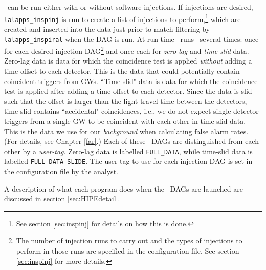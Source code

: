 \hipe~can be run either with or without software injections. If injections are
desired, \texttt{lalapps\_inspinj} is run to create a list of injections to
perform,\footnote{See section \ref{sec:inspinj} for details on how this is
done.} which are created and inserted into the data just prior to match
filtering by \texttt{lalapps\_inspiral} \cite{brown-2005-22} when the \ac{DAG}
is run. At run-time \ihope~runs \hipe~several times: once for each desired
injection \ac{DAG}\footnote{The number of injection runs to carry out and the
types of injections to perform in those runs are specified in the configuration
file.  See section \ref{sec:inspinj} for more details.} and once each for
\emph{zero-lag} and \emph{time-slid} data. Zero-lag data is data for which the
coincidence test is applied \emph{without} adding a time offset to each
detector. This is the data that could potentially contain coincident triggers
from \acp{GW}.  ``Time-slid" data is data for which the coincidence test is
applied after adding a time offset to each detector. Since the data is slid
such that the offset is larger than the light-travel time between the
detectors, time-slid contains ``accidental" coincidences, i.e., we do not
expect single-detector triggers from a single \ac{GW} to be coincident with
each other in time-slid data. This is the data we use for our \emph{background}
when calculating false alarm rates. (For details, see Chapter \ref{far}.) Each
of these \hipe~\acp{DAG} are distinguished from each other by a
\emph{user-tag}. Zero-lag data is labelled \verb|FULL_DATA|, while time-slid
data is labelled \verb|FULL_DATA_SLIDE|. The user tag to use for each injection
\ac{DAG} is set in the configuration file by the analyst.

A description of what each program does when the \hipe~\acp{DAG} are launched
are discussed in section \ref{sec:HIPEdetail}.

